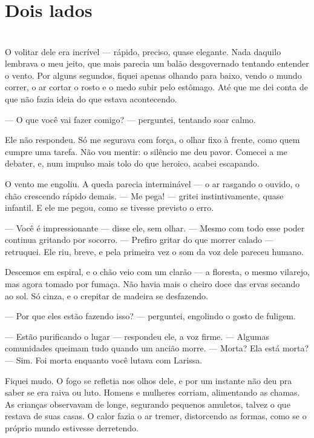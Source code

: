 \newpage

\ifdefined\useChapters
\chapter{Dois lados}
\else
\chapter{}
\fi

O volitar dele era incrível — rápido, preciso, quase elegante.  
Nada daquilo lembrava o meu jeito, que mais parecia um balão desgovernado tentando entender o vento.  
Por alguns segundos, fiquei apenas olhando para baixo, vendo o mundo correr, o ar cortar o rosto e o medo subir pelo estômago.  
Até que me dei conta de que não fazia ideia do que estava acontecendo.

— O que você vai fazer comigo? — perguntei, tentando soar calmo.

Ele não respondeu.  
Só me segurava com força, o olhar fixo à frente, como quem cumpre uma tarefa.  
Não vou mentir: o silêncio me deu pavor.  
Comecei a me debater, e, num impulso mais tolo do que heroico, acabei escapando.

O vento me engoliu.  
A queda parecia interminável — o ar rasgando o ouvido, o chão crescendo rápido demais.  
— Me pega! — gritei instintivamente, quase infantil.
E ele me pegou, como se tivesse previsto o erro.

— Você é impressionante — disse ele, sem olhar. — Mesmo com todo esse poder continua gritando por socorro.  
— Prefiro gritar do que morrer calado — retruquei.  
Ele riu, breve, e pela primeira vez o som da voz dele pareceu humano.

Descemos em espiral, e o chão veio com um clarão — a floresta, o mesmo vilarejo, mas agora tomado por fumaça.  
Não havia mais o cheiro doce das ervas secando ao sol.  
Só cinza, e o crepitar de madeira se desfazendo.

— Por que eles estão fazendo isso? — perguntei, engolindo o gosto de fuligem.  

— Estão purificando o lugar — respondeu ele, a voz firme.  
— Algumas comunidades queimam tudo quando um ancião morre.  
— Morta? Ela está morta?  
— Sim. Foi morta enquanto você lutava com Larissa.

Fiquei mudo.  
O fogo se refletia nos olhos dele, e por um instante não deu pra saber se era raiva ou luto.  
Homens e mulheres corriam, alimentando as chamas.  
As crianças observavam de longe, segurando pequenos amuletos, talvez o que restava de suas casas.  
O calor fazia o ar tremer, distorcendo as formas, como se o próprio mundo estivesse derretendo.

